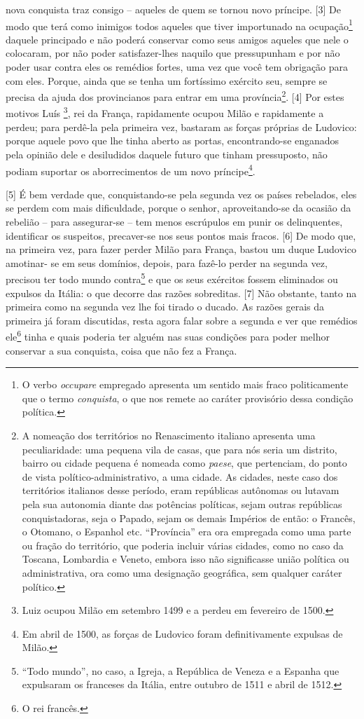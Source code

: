 nova conquista traz consigo -- aqueles de quem se tornou novo príncipe.
{[}3{]} De modo que terá como inimigos todos aqueles que tiver
importunado na ocupação\footnote{O verbo \emph{occupare} empregado
  apresenta um sentido mais fraco politicamente que o termo
  \emph{conquista}, o que nos remete ao caráter provisório dessa
  condição política.} daquele principado e não poderá conservar como
seus amigos aqueles que nele o colocaram, por não poder satisfazer-lhes
naquilo que pressupunham e por não poder usar contra eles os remédios
fortes, uma vez que você tem obrigação para com eles. Porque, ainda que
se tenha um fortíssimo exército seu, sempre se precisa da ajuda dos
provincianos para entrar em uma província\footnote{A nomeação dos
  territórios no Renascimento italiano apresenta uma peculiaridade: uma
  pequena vila de casas, que para nós seria um distrito, bairro ou
  cidade pequena é nomeada como \emph{paese}, que pertenciam, do ponto
  de vista político-administrativo, a uma cidade. As cidades, neste caso
  dos territórios italianos desse período, eram repúblicas autônomas ou
  lutavam pela sua autonomia diante das potências políticas, sejam
  outras repúblicas conquistadoras, seja o Papado, sejam os demais
  Impérios de então: o Francês, o Otomano, o Espanhol etc. ``Província''
  era ora empregada como uma parte ou fração do território, que poderia
  incluir várias cidades, como no caso da Toscana, Lombardia e Veneto,
  embora isso não significasse união política ou administrativa, ora
  como uma designação geográfica, sem qualquer caráter político.}.
{[}4{]} Por estes motivos Luís \footnote{Luiz  ocupou Milão em
  setembro 1499 e a perdeu em fevereiro de 1500.}, rei da França,
rapidamente ocupou Milão e rapidamente a perdeu; para perdê-la pela
primeira vez, bastaram as forças próprias de Ludovico: porque aquele
povo que lhe tinha aberto as portas, encontrando-se enganados pela
opinião dele e desiludidos daquele futuro que tinham pressuposto, não
podiam suportar os aborrecimentos de um novo príncipe\footnote{Em abril
  de 1500, as forças de Ludovico foram definitivamente expulsas de
  Milão.}.

{[}5{]} É bem verdade que, conquistando-se pela segunda vez os países
rebelados, eles se perdem com mais dificuldade, porque o senhor,
aproveitando-se da ocasião da rebelião -- para assegurar-se -- tem menos
escrúpulos em punir os delinquentes, identificar os suspeitos,
precaver-se nos seus pontos mais fracos. {[}6{]} De modo que, na
primeira vez, para fazer perder Milão para França, bastou um duque
Ludovico amotinar- se em seus domínios, depois, para fazê-lo perder na
segunda vez, precisou ter todo mundo contra\footnote{``Todo mundo'', no
  caso, a Igreja, a República de Veneza e a Espanha que expulsaram os
  franceses da Itália, entre outubro de 1511 e abril de 1512.} e que os
seus exércitos fossem eliminados ou expulsos da Itália: o que decorre
das razões sobreditas. {[}7{]} Não obstante, tanto na primeira como na
segunda vez lhe foi tirado o ducado. As razões gerais da primeira já
foram discutidas, resta agora falar sobre a segunda e ver que remédios
ele\footnote{O rei francês.} tinha e quais poderia ter alguém nas suas
condições para poder melhor conservar a sua conquista, coisa que não fez
a França.

